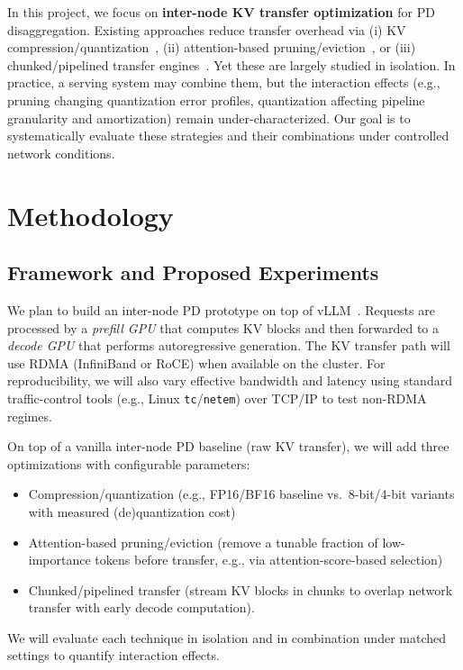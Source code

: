 \documentclass{article} %
\begin{document}
In this project, we focus on \textbf{inter-node KV transfer optimization} for PD disaggregation. 
Existing approaches reduce transfer overhead via (i) KV compression/quantization~\citep{liu2024cachegenkvcachecompression, zhang2025hackhomomorphicaccelerationcompression}, (ii) attention-based pruning/eviction~\citep{zhang2023h2oheavyhitteroracleefficient, zhang2025pdtrimtargetedpruningprefilldecode}, or (iii) chunked/pipelined transfer engines~\citep{qin2025mooncakekvcachecentricdisaggregatedarchitecture, kwon2023efficient}.
Yet these are largely studied in isolation.
In practice, a serving system may combine them, but the interaction effects (e.g., pruning changing quantization error profiles, quantization affecting pipeline granularity and amortization) remain under-characterized. 
Our goal is to systematically evaluate these strategies and their combinations under controlled network conditions.

\section{Methodology}

\subsection{Framework and Proposed Experiments}

We plan to build an inter-node PD prototype on top of vLLM~\citep{kwon2023efficient}. 
Requests are processed by a \emph{prefill GPU} that computes KV blocks and then forwarded to a \emph{decode GPU} that performs autoregressive generation. 
The KV transfer path will use RDMA (InfiniBand or RoCE) when available on the cluster. For reproducibility, we will also vary effective bandwidth and latency using standard traffic-control tools (e.g., Linux \texttt{tc}/\texttt{netem}) over TCP/IP to test non-RDMA regimes.

On top of a vanilla inter-node PD baseline (raw KV transfer), we will add three optimizations with configurable parameters:
\begin{itemize}
    \item Compression/quantization (e.g., FP16/BF16 baseline vs.\ 8-bit/4-bit variants with measured (de)quantization cost)
    \item Attention-based pruning/eviction (remove a tunable fraction of low-importance tokens before transfer, e.g., via attention-score-based selection)
    \item Chunked/pipelined transfer (stream KV blocks in chunks to overlap network transfer with early decode computation).
\end{itemize}
We will evaluate each technique in isolation and in combination under matched settings to quantify interaction effects.
\end{document}
